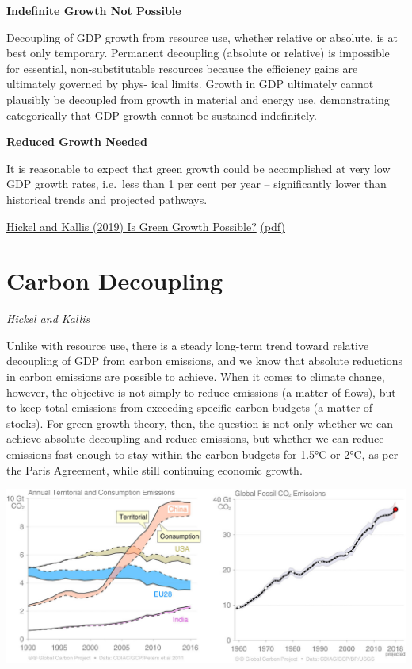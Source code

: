 \documentclass[
]{book}
\begin{document}
\textbf{Indefinite Growth Not Possible}

Decoupling of GDP growth from resource use, whether relative or
absolute, is at best only temporary. Permanent decoupling (absolute or relative) is impossible for
essential, non-substitutable resources because the efficiency gains are ultimately governed by phys-
ical limits. Growth in GDP ultimately cannot plausibly be decoupled from growth in material and
energy use, demonstrating categorically that GDP growth cannot be sustained indefinitely.

\textbf{Reduced Growth Needed}

It is reasonable to expect that green growth
could be accomplished at very low GDP growth rates, i.e.~less than 1 per cent per year -- significantly
lower than historical trends and projected pathways.

\href{https://doi.org/10.1080/13563467.2019.1598964}{Hickel and Kallis (2019) Is Green Growth Possible?}
\href{pdf/Hickel_and_Kallis_2019_Is_Green_Growth_Possible.pdf}{(pdf)}

\hypertarget{carbon-decoupling}{%
\section{Carbon Decoupling}\label{carbon-decoupling}}

\emph{Hickel and Kallis}

Unlike with resource use, there is a steady long-term trend toward relative decoupling of GDP from
carbon emissions, and we know that absolute reductions in carbon emissions are possible to achieve.
When it comes to climate change, however, the objective is not simply to reduce emissions (a matter
of flows), but to keep total emissions from exceeding specific carbon budgets (a matter of stocks). For
green growth theory, then, the question is not only whether we can achieve absolute decoupling and
reduce emissions, but whether we can reduce emissions fast enough to stay within the carbon
budgets for 1.5°C or 2°C, as per the Paris Agreement, while still continuing economic growth.

\includegraphics{fig/Hickel_Carbon_Decoupling.png}
\end{document}
